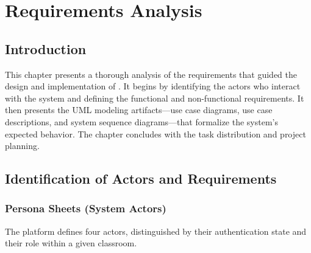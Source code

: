 \chapter{Requirements Analysis}
\label{chap:requirements}

\section*{Introduction}

This chapter presents a thorough analysis of the requirements that guided the design and implementation of \eduspace{}.
It begins by identifying the actors who interact with the system and defining the functional and non-functional requirements.
It then presents the UML modeling artifacts---use case diagrams, use case descriptions, and system sequence diagrams---that formalize the system's expected behavior.
The chapter concludes with the task distribution and project planning.

\section{Identification of Actors and Requirements}
\label{sec:actors-requirements}

\subsection{Persona Sheets (System Actors)}
\label{sec:personas}

The \eduspace{} platform defines four actors, distinguished by their authentication state and their role within a given classroom.

